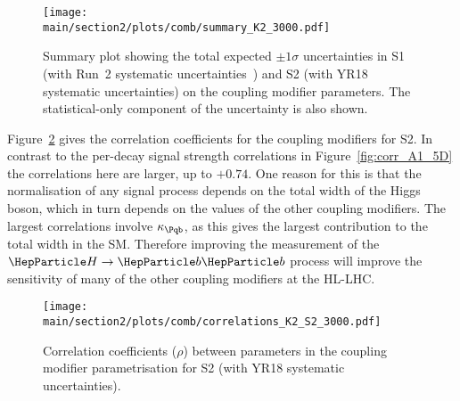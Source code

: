 \begin{figure}[hbtp]
\centering
\texttt{[image: \\main/section2/plots/comb/summary\_K2\_3000.pdf]}%
\caption{Summary plot showing the total expected $\pm 1\sigma$ uncertainties in S1 (with Run~2 systematic uncertainties~\cite{Sirunyan:2018koj}) and S2 (with YR18 systematic uncertainties) on the coupling modifier parameters. The statistical-only component of the uncertainty is also shown.}
\label{fig:summary_K2}
\end{figure}


\begin{table}[hbtp]
\centering
\caption{The expected $\pm 1\sigma$ uncertainties, expressed as percentages, on the coupling modifier parameters, as well as $\Bbsm$ and $\GammaSM$. Due to the constraint $\Bbsm \geq 0$ the values for this parameter correspond to the $+1\sigma$ uncertainties only.  Values are given for both S1 (with Run~2 systematic uncertainties~\cite{Sirunyan:2018koj}) and S2 (with YR18 systematic uncertainties). The total uncertainty is decomposed into four components: statistical (Stat), signal theory (SigTh), background theory (BkgTh) and experimental (Exp).}

\label{tab:summary_K2}
\vspace{0.5cm}
\end{table}

Figure~\ref{fig:corr_K2} gives the correlation coefficients for the coupling modifiers for S2. In contrast to the per-decay signal strength correlations in Figure~\ref{fig:corr_A1_5D} the correlations here are larger, up to $+0.74$. One reason for this is that the normalisation of any signal process depends on the total width of the Higgs boson, which in turn depends on the values of the other coupling modifiers. The largest correlations involve $\kb$, as this gives the largest contribution to the total width in the SM. Therefore improving the measurement of the $\hbb$ process will improve the sensitivity of many of the other coupling modifiers at the HL-LHC.

\begin{figure}[hbtp]
\centering
\texttt{[image: \\main/section2/plots/comb/correlations\_K2\_S2\_3000.pdf]}%
\caption{Correlation coefficients ($\rho$) between parameters in the coupling modifier parametrisation for S2 (with YR18 systematic uncertainties).}
\label{fig:corr_K2}
\end{figure}

